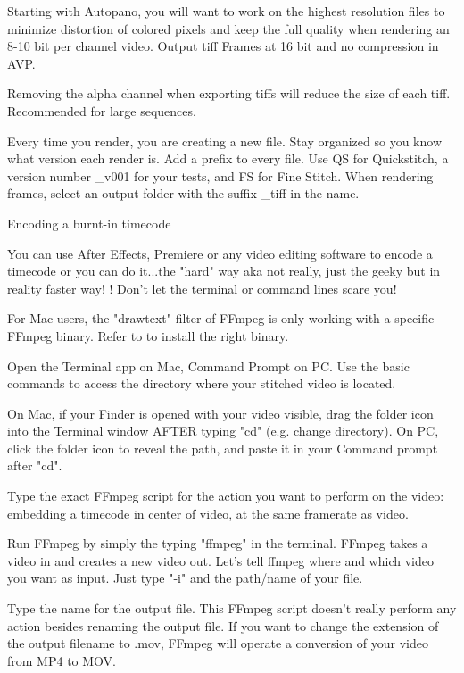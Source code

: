 \begin{fullwidth}
Starting with Autopano, you will want to work on the highest resolution files to minimize distortion of colored pixels and keep the full quality when rendering an 8-10 bit per channel video. Output tiff Frames at 16 bit and no compression in AVP.


\tip Removing the alpha channel when exporting tiffs will reduce the size of each tiff. Recommended for large sequences.

Every time you render, you are creating a new file. Stay organized so you know what version each render is. Add a prefix to every file. Use QS for Quickstitch, a version number \_v001 for your tests, and FS for Fine Stitch. When rendering frames, select an output folder with the suffix \_tiff in the name.

\clearpage
{\large Encoding a burnt-in timecode \par}

You can use After Effects, Premiere or any video editing software to encode a timecode or you can do it...the "hard" way aka not really, just the geeky but in reality faster way! \textbf{}! Don't let the terminal or command lines scare you!

For Mac users, the "drawtext" filter of FFmpeg is only working with a specific FFmpeg binary. Refer to \textbf{} to install the right binary.

Open the Terminal app on Mac, Command Prompt on PC. Use the basic commands to access the directory where your stitched video is located.


\tip On Mac, if your Finder is opened with your video visible, drag the folder icon into the Terminal window AFTER typing "cd" (e.g. change directory). On PC, click the folder icon to reveal the path, and paste it in your Command prompt after "cd".

Type the exact FFmpeg script for the action you want to perform on the video: embedding a timecode in center of video, at the same framerate as video.

Run FFmpeg by simply the typing "ffmpeg" in the terminal. FFmpeg takes a video in and creates a new video out. Let's tell ffmpeg where and which video you want as input. Just type "-i" and the path/name of your file.


Type the name for the output file. This FFmpeg script doesn't really perform any action besides renaming the output file. If you want to change the extension of the output filename to .mov, FFmpeg will operate a conversion of your video from MP4 to MOV.


\end{fullwidth}
